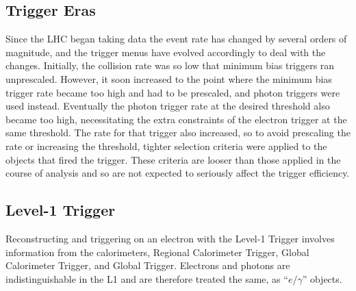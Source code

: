 \subsection{Trigger Eras}
\label{evSel:triggerEras}
Since the LHC began taking data the event rate has changed by several orders of magnitude,  
and the trigger menus have evolved accordingly to deal with the changes.  
Initially, the collision rate was so low that minimum bias triggers ran unprescaled.  
However, it soon increased to the point where the minimum bias trigger rate became too high
and had to be prescaled, and photon triggers were used instead.  
Eventually the photon trigger rate at the desired threshold also became too high,
necessitating the extra constraints of the electron trigger at the same threshold.  
The rate for that trigger also increased, so to avoid prescaling the rate or increasing the threshold,
tighter selection criteria were applied to the objects that fired the trigger.  
These criteria are looser than those applied in the course of analysis and so are not expected
to seriously affect the trigger efficiency.  



\subsection{Level-1 Trigger}
\label{evSel:L1}
Reconstructing and triggering on an electron with the Level-1 Trigger 
involves information from the calorimeters, 
Regional Calorimeter Trigger, Global Calorimeter Trigger, and 
Global Trigger.  
Electrons and photons are indistinguishable in the L1 and are therefore 
treated the same, as ``$e/\gamma$'' objects.  

